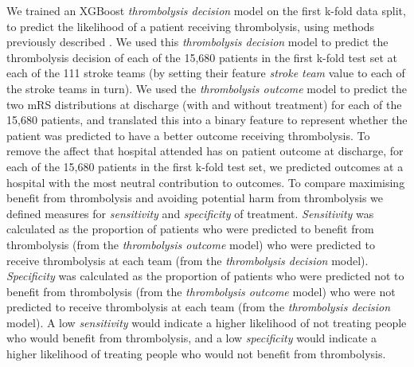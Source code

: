 We trained an XGBoost \textit{thrombolysis decision} model on the first k-fold data split, to predict the likelihood of a patient receiving thrombolysis, using methods previously described \cite{pearn_what_2023}. We used this \textit{thrombolysis decision} model to predict the thrombolysis decision of each of the 15,680 patients in the first k-fold test set at each of the 111 stroke teams (by setting their feature \textit{stroke team} value to each of the stroke teams in turn). We used the \textit{thrombolysis outcome} model to predict the two mRS distributions at discharge (with and without treatment) for each of the 15,680 patients, and translated this into a binary feature to represent whether the patient was predicted to have a better outcome receiving thrombolysis. To remove the affect that hospital attended has on patient outcome at discharge, for each of the 15,680 patients in the first k-fold test set, we predicted outcomes at a hospital with the most neutral contribution to outcomes. To compare maximising benefit from thrombolysis and avoiding potential harm from thrombolysis we defined measures for \textit{sensitivity} and \textit{specificity} of treatment. \textit{Sensitivity} was calculated as the proportion of patients who were predicted to benefit from thrombolysis (from the \textit{thrombolysis outcome} model) who were predicted to receive thrombolysis at each team (from the \textit{thrombolysis decision} model). \textit{Specificity} was calculated as the proportion of patients who were predicted not to benefit from thrombolysis (from the \textit{thrombolysis outcome} model) who were not predicted to receive thrombolysis at each team (from the \textit{thrombolysis decision} model). A low \textit{sensitivity} would indicate a higher likelihood of not treating people who would benefit from thrombolysis, and a low \textit{specificity} would indicate a higher likelihood of treating people who would not benefit from thrombolysis.